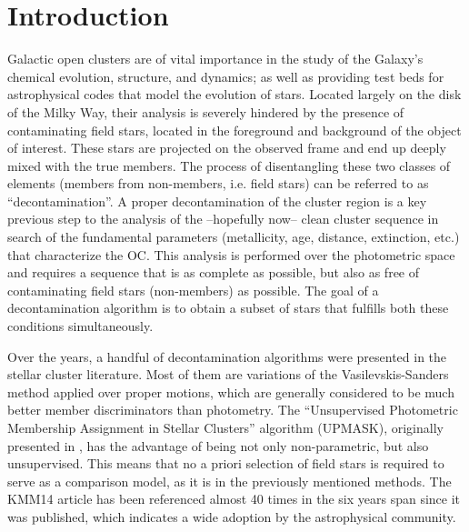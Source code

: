 \documentclass{aa}
\begin{document}

\maketitle



\section{Introduction}
 \label{sec:intro}

 Galactic open clusters are of vital importance in the study of the
 Galaxy's chemical evolution, structure, and dynamics; as well as providing
 test beds for astrophysical codes that model the evolution of stars.
 Located largely on the disk of the Milky Way, their analysis is severely
 hindered by the presence of contaminating field stars, located in the
 foreground and background of the object of interest. These stars are
 projected on the observed frame and end up deeply mixed
 with the true members. The process of disentangling these two classes of
 elements (members from non-members, i.e. field stars) can be referred
 to as ``decontamination''.
 A proper decontamination of the cluster region is a key previous step to the
 analysis of the --hopefully now-- clean cluster sequence in search of the
 fundamental parameters (metallicity, age, distance, extinction, etc.) that
 characterize the OC. This analysis is performed over the photometric space
 and requires a sequence that is as
 complete as possible, but also as free of contaminating field stars 
 (non-members) as possible. The goal of a decontamination algorithm is to
 obtain a subset of stars that fulfills both these conditions simultaneously.

 Over the years, a handful of decontamination algorithms were presented in the
 stellar cluster literature. Most of them are variations of the
 Vasilevskis-Sanders method \citep{Vasilevskis_1958,Sanders_1971} applied over
 proper motions, which are generally considered to be much better member
 discriminators than photometry.
 The ``Unsupervised Photometric Membership Assignment in Stellar Clusters''
 algorithm (UPMASK), originally presented in \citet[][henceforth KMM14]{KMM14},
 has the advantage of being not only non-parametric, but also unsupervised.
 This means that no a priori selection of field stars is required to serve as a
 comparison model, as it is in the previously mentioned methods.
 The KMM14 article has been referenced almost 40 times in the six years span
 since it was published, which indicates a wide adoption by the astrophysical
 community.
\end{document}
